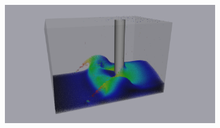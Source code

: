 \begin{figure}[H]
\begin{subfigure}{0.325 \textwidth}
		\centering
		\includegraphics[width=1.0\textwidth]{images/CFD_DEM/lfluid55.png}
	\end{subfigure}


\end{figure}
